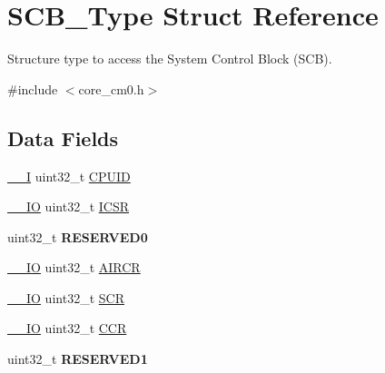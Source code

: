 \hypertarget{struct_s_c_b___type}{\section{S\-C\-B\-\_\-\-Type Struct Reference}
\label{struct_s_c_b___type}
}


Structure type to access the System Control Block (S\-C\-B).  




{\ttfamily \#include $<$core\-\_\-cm0.\-h$>$}

\subsection*{Data Fields}
\begin{DoxyCompactItemize}
\item 
\hyperlink{group___c_m_s_i_s__core__definitions_gaf63697ed9952cc71e1225efe205f6cd3}{\-\_\-\-\_\-\-I} uint32\-\_\-t \hyperlink{struct_s_c_b___type_a30abfea43143a424074f682bd61eace0}{C\-P\-U\-I\-D}
\item 
\hyperlink{group___c_m_s_i_s__core__definitions_gaec43007d9998a0a0e01faede4133d6be}{\-\_\-\-\_\-\-I\-O} uint32\-\_\-t \hyperlink{struct_s_c_b___type_a8fec9e122b923822e7f951cd48cf1d47}{I\-C\-S\-R}
\item 
\hypertarget{struct_s_c_b___type_af86c61a5d38a4fc9cef942a12744486b}{uint32\-\_\-t {\bfseries R\-E\-S\-E\-R\-V\-E\-D0}}\label{struct_s_c_b___type_af86c61a5d38a4fc9cef942a12744486b}

\item 
\hyperlink{group___c_m_s_i_s__core__definitions_gaec43007d9998a0a0e01faede4133d6be}{\-\_\-\-\_\-\-I\-O} uint32\-\_\-t \hyperlink{struct_s_c_b___type_aaec159b48828355cb770049b8b2e8d91}{A\-I\-R\-C\-R}
\item 
\hyperlink{group___c_m_s_i_s__core__definitions_gaec43007d9998a0a0e01faede4133d6be}{\-\_\-\-\_\-\-I\-O} uint32\-\_\-t \hyperlink{struct_s_c_b___type_a64a95891ad3e904dd5548112539c1c98}{S\-C\-R}
\item 
\hyperlink{group___c_m_s_i_s__core__definitions_gaec43007d9998a0a0e01faede4133d6be}{\-\_\-\-\_\-\-I\-O} uint32\-\_\-t \hyperlink{struct_s_c_b___type_a5e1322e27c40bf91d172f9673f205c97}{C\-C\-R}
\item 
\hypertarget{struct_s_c_b___type_ac4ac04e673b5b8320d53f7b0947db902}{uint32\-\_\-t {\bfseries R\-E\-S\-E\-R\-V\-E\-D1}}\label{struct_s_c_b___type_ac4ac04e673b5b8320d53f7b0947db902}


\end{DoxyCompactItemize}
